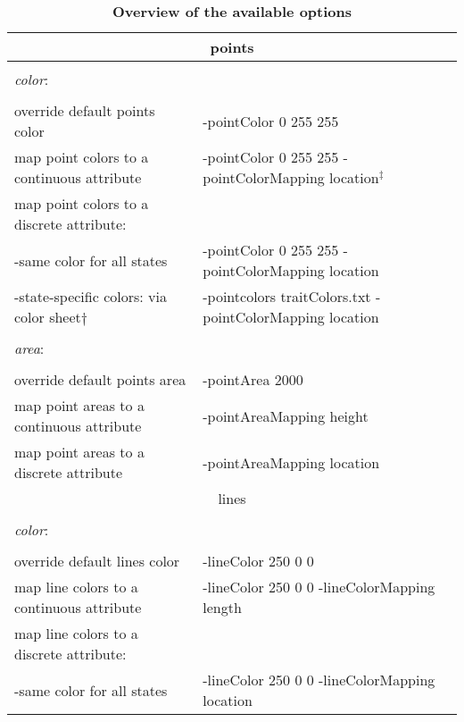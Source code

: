 \documentclass[english]{paper}
\begin{document}
\vspace{0.5cm}
\begin{table}[!ht]
\centering
\caption[Overview of the available options]{\footnotesize{\textbf{Overview of the available options}}}
\begin{tabular}{ll}
\\
\toprule
			\multicolumn{2}{c}{points}			\\
\midrule	
								&						\\
\textit{color}:					&						\\
								&						\\
override default points color			& -pointColor 0 255 255										\\
map point colors to a continuous attribute 	& -pointColor 0 255 255 -pointColorMapping location$^\ddagger$\\
map point colors to a discrete attribute:	& 					 									\\
	-same color for all states			&-pointColor 0 255 255 -pointColorMapping location					\\
	-state-specific colors: via color sheet$\dagger$&-pointcolors traitColors.txt -pointColorMapping location		\\
								&						\\
\textit{area}: 					&						\\
								&						\\
override default points area			& -pointArea 2000	\\						
map point areas to a continuous attribute	& -pointAreaMapping height									\\
map point areas to a discrete attribute	& -pointAreaMapping location									\\
\midrule
			\multicolumn{2}{c}{lines}			\\
\midrule
								&						\\
\textit{color}:					&						\\
								&						\\
override default lines color				&	-lineColor 250 0 0		\\
map line colors to a continuous attribute	&	-lineColor 250 0 0 -lineColorMapping length				\\
map line colors to a discrete attribute:	&						\\
	-same color for all states			&	-lineColor 250 0 0 -lineColorMapping location				\\

\end{tabular}
\end{table}
\end{document}
